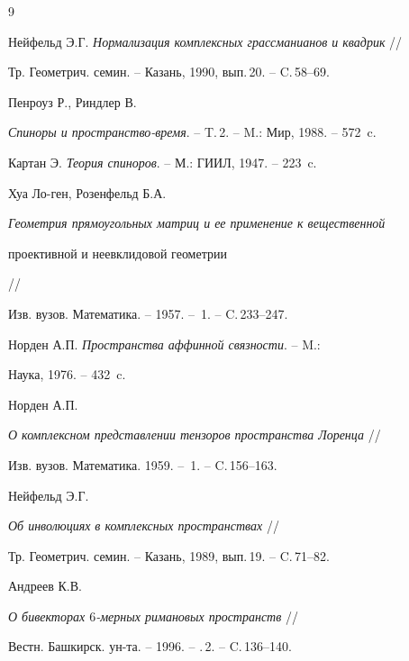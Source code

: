 \begin{thebibliography}{9}







Нейфельд Э.Г. {\em Нормализация комплексных грассманианов и квадрик} //


Тр. Геометрич. семин. -- Казань, 1990, вып.\,20. -- C.\,58--69.




Пенроуз Р., Риндлер В.


{\em Спиноры и пространство-время}. -- T.\,2. -- M.: Мир, 1988. -- 572~c.




Картан Э. {\em Теория спиноров}. -- М.: ГИИЛ, 1947. -- 223~c.




Хуа Ло-ген, Розенфельд Б.А.


{\em Геометрия прямоугольных матриц и ее применение к вещественной


проективной и неевклидовой геометрии} //


Изв. вузов. Математика. -- 1957. -- \No\,1. -- C.\,233--247.




Норден А.П. {\em Пространства аффинной связности}. -- M.:


Наука, 1976. -- 432~c.




Норден А.П.


{\em О комплексном представлении тензоров пространства Лоренца} //


Изв. вузов. Математика. 1959. -- \No\,1. -- C.\,156--163.




Нейфельд Э.Г.


{\em Об инволюциях в комплексных пространствах} //


Тр. Геометрич. семин. -- Казань, 1989, вып.\,19. -- C.\,71--82.




Андреев К.В.


{\em О бивекторах $6$-мерных римановых пространств} //


Вестн. Башкирск. ун-та. -- 1996. -- \No.\,2. -- C.\,136--140.





\end{thebibliography}





\vskip 2cm












\label{end}





